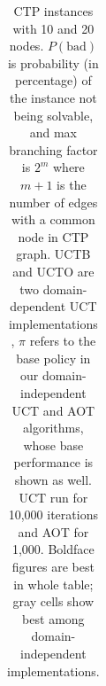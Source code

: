 \documentclass[letterpaper]{article}
\newcommand{\G}{\cellcolor[gray]{0.75}}
\begin{document}
\begin{table}[t]
{\begin{minipage}{7.3in}
\begin{tabular}{l@{}rr@{}r rr rrr rrr}
      \bottomrule
    \end{tabular}
  \end{minipage}
}
\caption{\small  CTP instances with 10 and 20 nodes. $P(\text{bad})$ is probability (in percentage) of
  the instance not being solvable,
  and max branching factor is $2^m$ where $m+1$ is the number of edges with a common node in CTP graph. 
  UCTB and UCTO are  two domain-dependent UCT implementations \cite{malte:ctp}, $\pi$ refers to the base
  policy in our domain-independent UCT and  AOT algorithms, whose  base performance is shown as well. 
  UCT run for 10,000 iterations and AOT for 1,000. Boldface figures are best in whole table; gray cells show
  best among domain-independent implementations.}
\label{table:results:ctp}
\end{table}
\end{document}
